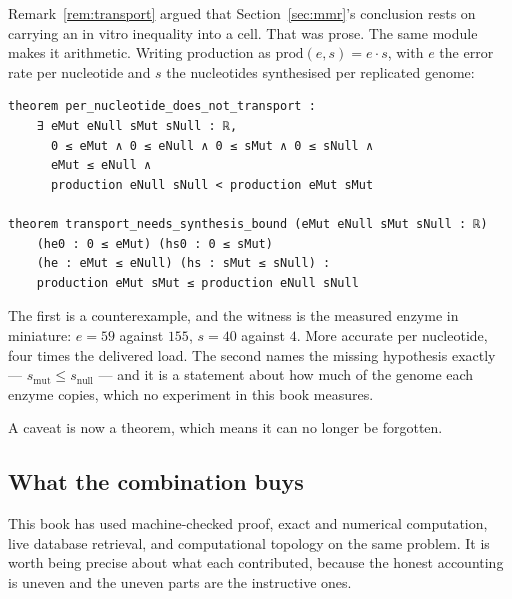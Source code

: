 Remark~\ref{rem:transport} argued that Section~\ref{sec:mmr}'s conclusion rests
on carrying an in vitro inequality into a cell. That was prose. The same module
makes it arithmetic. Writing production as
$\mathrm{prod}(e,s) = e\cdot s$, with $e$ the error rate per nucleotide and $s$
the nucleotides synthesised per replicated genome:

\begin{lstlisting}
theorem per_nucleotide_does_not_transport :
    ∃ eMut eNull sMut sNull : ℝ,
      0 ≤ eMut ∧ 0 ≤ eNull ∧ 0 ≤ sMut ∧ 0 ≤ sNull ∧
      eMut ≤ eNull ∧
      production eNull sNull < production eMut sMut

theorem transport_needs_synthesis_bound (eMut eNull sMut sNull : ℝ)
    (he0 : 0 ≤ eMut) (hs0 : 0 ≤ sMut)
    (he : eMut ≤ eNull) (hs : sMut ≤ sNull) :
    production eMut sMut ≤ production eNull sNull
\end{lstlisting}

The first is a counterexample, and the witness is the measured enzyme in
miniature: $e = 59$ against $155$, $s = 40$ against $4$. More accurate per
nucleotide, four times the delivered load. The second names the missing
hypothesis exactly --- $s_{\mathrm{mut}} \le s_{\mathrm{null}}$ --- and it is a
statement about how much of the genome each enzyme copies, which no experiment
in this book measures.

A caveat is now a theorem, which means it can no longer be forgotten.

\subsection{What the combination buys}\label{sub:combination}

This book has used machine-checked proof, exact and numerical computation, live
database retrieval, and computational topology on the same problem. It is worth
being precise about what each contributed, because the honest accounting is
uneven and the uneven parts are the instructive ones.

